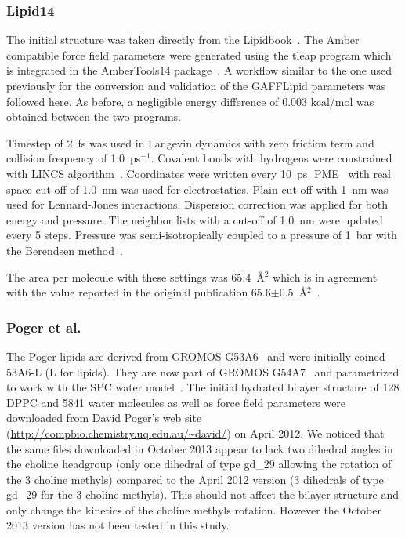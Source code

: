 \documentclass[journal=jacsat,manuscript=article]{achemso}
\begin{document}
\subsubsection{Lipid14}
The initial structure was taken directly from the Lipidbook~\cite{domanski10}.
The Amber compatible force field parameters were generated using the tleap program which is integrated in the AmberTools14 package~\cite{ferrer13}. 
A workflow similar to the one used previously for the conversion and validation of the GAFFLipid parameters was followed here. 
As before, a negligible energy difference of 0.003 kcal/mol was obtained between the two programs.

Timestep of 2~fs was used in Langevin dynamics with zero friction term and collision frequency of 1.0~ps$^{-1}$. 
Covalent bonds with hydrogens were constrained with LINCS algorithm~\cite{hess97,hess07}.
Coordinates were written every 10~ps. PME~\cite{darden93,essman95} with real space cut-off of 1.0~nm was used 
for electrostatics. Plain cut-off with 1~nm was used for Lennard-Jones interactions. Dispersion correction
was applied for both energy and pressure. The neighbor lists with a cut-off of 1.0~nm were updated every 5 steps. 
Pressure was semi-isotropically coupled to a pressure of 1~bar with the Berendsen method~\cite{berendsen84}.

The area per molecule with these settings was 65.4~\AA$^2$ which is in agreement with the value reported in the original publication 65.6$\pm$0.5~\AA$^2$~\cite{dickson14}.

\subsubsection{Poger et al.}
The Poger lipids are derived from GROMOS G53A6~\cite{poger10} and were initially coined 53A6-L (L for lipids). They are now part of GROMOS G54A7~\cite{poger12} 
and parametrized to work with the SPC water model~\cite{berendsen81}. The initial hydrated bilayer structure of 128 DPPC and 5841 water molecules as well as force field parameters were downloaded 
from David Poger's web site (\url{http://compbio.chemistry.uq.edu.au/~david/}) on April 2012. 
We noticed that the same files downloaded in October 2013 appear to lack two dihedral angles in the choline headgroup (only one dihedral of type gd\_29 allowing 
the rotation of the 3 choline methyls) compared to the April 2012 version (3 dihedrals of type gd\_29 for the 3 choline methyls). This should not affect the 
bilayer structure and only change the kinetics of the choline methyls rotation. However the October 2013 version has not been tested in this study.
\end{document}

